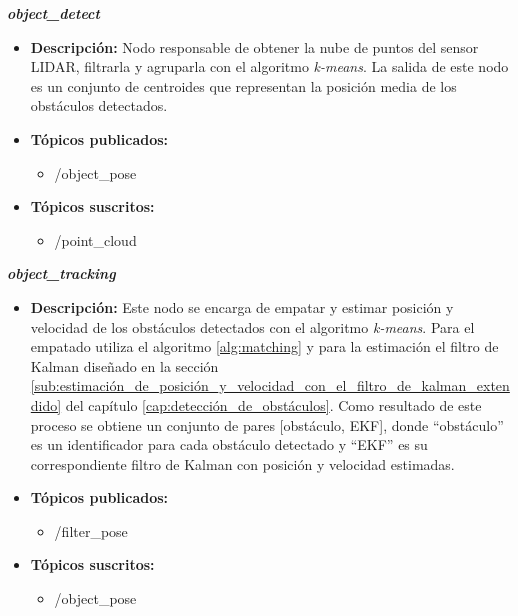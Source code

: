 \textbf{\textit{object\_detect}}
\begin{itemize}
    \item \textbf{Descripción:} Nodo responsable de obtener la nube de puntos del sensor LIDAR, filtrarla y agruparla con el algoritmo \textit{k-means}. La salida de este nodo es un conjunto de centroides que representan la posición media de los obstáculos detectados.
    \item \textbf{Tópicos publicados:}
    \begin{itemize}
        \item /object\_pose
    \end{itemize}
    \item \textbf{Tópicos suscritos:}
    \begin{itemize}
        \item /point\_cloud
    \end{itemize}
\end{itemize}

\newpage

\textbf{\textit{object\_tracking}}
\begin{itemize}
    \item \textbf{Descripción:} Este nodo se encarga de empatar y estimar posición y velocidad de los obstáculos detectados con el algoritmo \textit{k-means}. Para el empatado utiliza el algoritmo \ref{alg:matching} y para la estimación el filtro de Kalman diseñado en la sección \ref{sub:estimación_de_posición_y_velocidad_con_el_filtro_de_kalman_extendido} del capítulo \ref{cap:detección_de_obstáculos}. Como resultado de este proceso se obtiene un conjunto de pares [obstáculo, EKF], donde ``obstáculo'' es un identificador para cada obstáculo detectado y ``EKF'' es su correspondiente filtro de Kalman con posición y velocidad estimadas.
    \item \textbf{Tópicos publicados:} 
    \begin{itemize}
        \item /filter\_pose
    \end{itemize}
    \item \textbf{Tópicos suscritos:}
    \begin{itemize}
        \item /object\_pose
    \end{itemize}
\end{itemize}
\hfill

